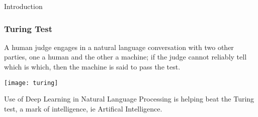 \begin{frame}
  \begin{center}
    {\Large Introduction}
  \end{center}
\end{frame}







\begin{frame}[fragile]\frametitle{Turing Test}

A human judge engages in a natural language conversation with two other parties, one a human and the other a machine; if the judge cannot reliably tell which is which, then the machine is said to pass the test. 

\begin{center}
\texttt{[image: turing]}
\end{center}

Use of Deep Learning in Natural Language Processing is helping beat the Turing test, a mark of intelligence, ie Artifical Intelligence.
\end{frame}

